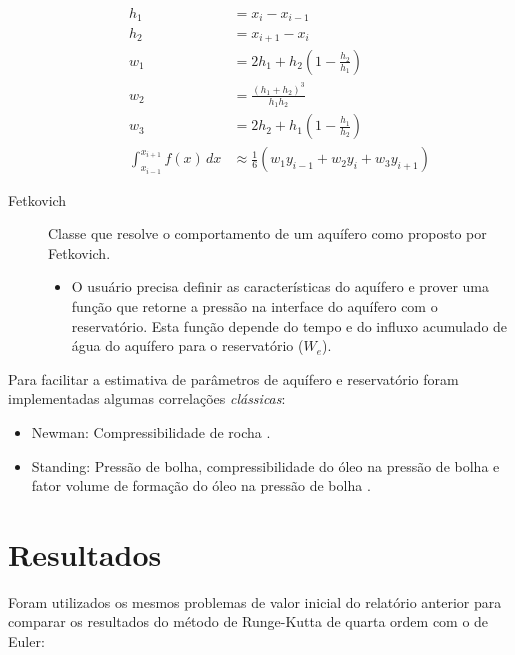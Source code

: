 \documentclass[final,5p]{elsarticle}
\numberwithin{equation}{section}
\begin{document}
\begin{description}
            \begin{align}
                h_1 &= x_i - x_{i-1} \nonumber \\
                h_2 &= x_{i+1} - x_{i} \nonumber \\
                w_1 &= 2 h_1 + h_2 \left(1-\frac{h_2}{h_1} \right) \nonumber \\
                w_2 &= \frac{(h_1 + h_2)^3}{h_1 h_2}\nonumber \\
                w_3 &= 2 h_2 + h_1 \left(1-\frac{h_1}{h_2} \right) \nonumber \\
                \int_{x_{i-1}}^{x_{i+1}} f(x) \, dx &\approx \frac{1}{6} (w_1 y_{i-1} + w_2 y_{i} + w_3 y_{i+1}) \label{eq:simpsonvariavel}
            \end{align}

            \item[Fetkovich] Classe que resolve o comportamento de um aquífero como proposto por Fetkovich.
            \begin{itemize}
                \item O usuário precisa definir as características do aquífero e prover uma função que retorne a pressão na interface do aquífero com o reservatório. Esta função depende do tempo e do influxo acumulado de água do aquífero para o reservatório ($W_e$).
            \end{itemize}
        \end{description}

        Para facilitar a estimativa de parâmetros de aquífero e reservatório foram implementadas algumas correlações \emph{clássicas}:

        \begin{itemize}
            \item Newman: Compressibilidade de rocha \cite{10.2118/3835-PA}.
            \item Standing: Pressão de bolha, compressibilidade do óleo na pressão de bolha e fator volume de formação do óleo na pressão de bolha \cite{standing1952volumetric}.
        \end{itemize}


\section{Resultados}

        Foram utilizados os mesmos problemas de valor inicial do relatório anterior para comparar os resultados do método de Runge-Kutta de quarta ordem com o de Euler:
\end{document}
